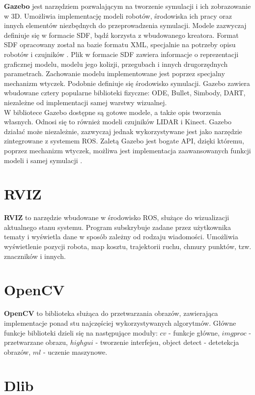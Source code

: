 {\textbf{Gazebo}} jest narzędziem pozwalającym na tworzenie symulacji i ich zobrazowanie w 3D. Umożliwia implementację modeli robotów, środowiska ich pracy oraz innych elementów niezbędnych do przeprowadzenia symulacji. Modele zazwyczaj definiuje się w formacie SDF, bądź korzysta z wbudowanego kreatora. Format SDF opracowany został na bazie formatu XML, specjalnie na potrzeby opisu robotów i czujników \cite{sdf}.  Plik w formacie SDF zawiera informacje o reprezentacji graficznej modelu, modelu jego kolizji, przegubach i innych drugorzędnych parametrach. Zachowanie modelu implementowane jest poprzez specjalny mechanizm wtyczek. Podobnie definiuje się środowisko symulacji. Gazebo zawiera wbudowane cztery popularne biblioteki fizyczne: ODE, Bullet, Simbody, DART, niezależne od implementacji samej warstwy wizualnej. \\
{\indent}W bibliotece Gazebo dostępne są gotowe modele, a także opis tworzenia własnych. Odnosi się to również modeli czujników LIDAR i Kinect. Gazebo działać może niezależnie, zazwyczaj jednak wykorzystywane jest jako narzędzie zintegrowane z systemem ROS. Zaletą Gazebo jest bogate API, dzięki któremu, poprzez mechanizm wtyczek, możliwa jest implementacja zaawansowanych funkcji modeli i samej symulacji \cite{gazebo}.

\section{RVIZ}

{\textbf{RVIZ}} to narzędzie wbudowane w środowisko ROS, służące do wizualizacji aktualnego stanu systemu. Program subskrybuje zadane przez użytkownika tematy i wyświetla dane w sposób zależny od rodzaju wiadomości. Umożliwia wyświetlenie pozycji robota, map kosztu, trajektorii ruchu, chmury punktów, tzw. znaczników i innych.

\section{OpenCV}

{\textbf{OpenCV}} to biblioteka służąca do przetwarzania obrazów, zawierająca implementacje ponad stu najczęściej wykorzystywanych algorytmów. Główne funkcje biblioteki dzieli się na następujące moduły: $cv$ - funkcje główne, $imgproc$ - przetwarzane obrazu, $highgui$ - tworzenie interfejsu, object detect - detetekcja obrazów, $ml$ - uczenie maszynowe\cite{opencv}.

\section{Dlib}

